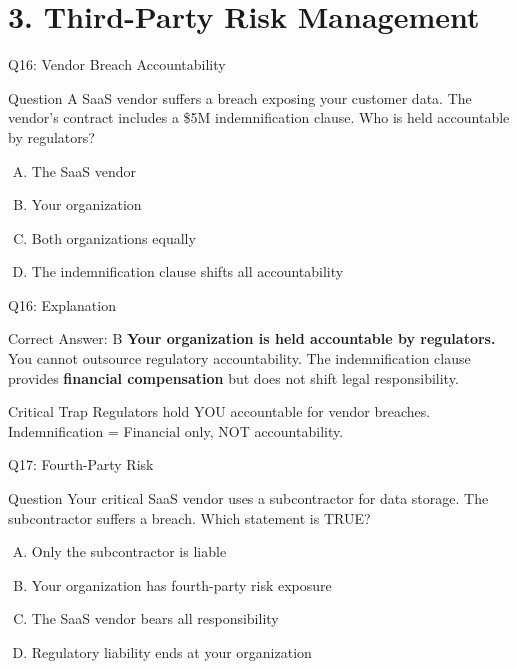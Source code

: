 \documentclass{beamer}
\begin{document}
	
	\section{3. Third-Party Risk Management}
	
	\begin{frame}{Q16: Vendor Breach Accountability}
		\begin{block}{Question}
			A SaaS vendor suffers a breach exposing your customer data. The vendor's contract includes a \$5M indemnification clause. Who is held accountable by regulators?
		\end{block}
		\begin{enumerate}[(A)]
			\item The SaaS vendor
			\item Your organization
			\item Both organizations equally
			\item The indemnification clause shifts all accountability
		\end{enumerate}
	\end{frame}
	
	\begin{frame}{Q16: Explanation}
		\begin{block}{Correct Answer: B}
			\textbf{Your organization is held accountable by regulators.} You cannot outsource regulatory accountability. The indemnification clause provides \textbf{financial compensation} but does not shift legal responsibility.
		\end{block}
		\begin{alertblock}{Critical Trap}
			Regulators hold YOU accountable for vendor breaches.
			Indemnification = Financial only, NOT accountability.
		\end{alertblock}
	\end{frame}
	
	\begin{frame}{Q17: Fourth-Party Risk}
		\begin{block}{Question}
			Your critical SaaS vendor uses a subcontractor for data storage. The subcontractor suffers a breach. Which statement is TRUE?
		\end{block}
		\begin{enumerate}[(A)]
			\item Only the subcontractor is liable
			\item Your organization has fourth-party risk exposure
			\item The SaaS vendor bears all responsibility
			\item Regulatory liability ends at your organization
		\end{enumerate}
	\end{frame}
	
\end{document}
